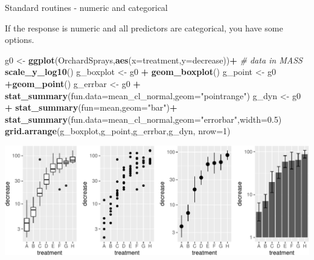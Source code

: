 \documentclass[
  ignorenonframetext,
]{beamer}
\newenvironment{Shaded}{\begin{snugshade}}{\end{snugshade}}
\newcommand{\CommentTok}[1]{\textcolor[rgb]{0.56,0.35,0.01}{\textit{#1}}}
\newcommand{\DataTypeTok}[1]{\textcolor[rgb]{0.13,0.29,0.53}{#1}}
\newcommand{\DecValTok}[1]{\textcolor[rgb]{0.00,0.00,0.81}{#1}}
\newcommand{\FloatTok}[1]{\textcolor[rgb]{0.00,0.00,0.81}{#1}}
\newcommand{\KeywordTok}[1]{\textcolor[rgb]{0.13,0.29,0.53}{\textbf{#1}}}
\newcommand{\NormalTok}[1]{#1}
\newcommand{\OperatorTok}[1]{\textcolor[rgb]{0.81,0.36,0.00}{\textbf{#1}}}
\newcommand{\StringTok}[1]{\textcolor[rgb]{0.31,0.60,0.02}{#1}}
\begin{document}
\begin{frame}[fragile]{Standard routines - numeric and categorical}
\protect\hypertarget{standard-routines---numeric-and-categorical}{}

If the response is numeric and all predictors are categorical, you have
some options.

\scriptsize

\begin{Shaded}
\begin{Highlighting}[]
\NormalTok{g0 <-}\StringTok{ }\KeywordTok{ggplot}\NormalTok{(OrchardSprays,}\KeywordTok{aes}\NormalTok{(}\DataTypeTok{x=}\NormalTok{treatment,}\DataTypeTok{y=}\NormalTok{decrease))}\OperatorTok{+}\StringTok{ }\CommentTok{# data in MASS}
\StringTok{  }\KeywordTok{scale_y_log10}\NormalTok{()}
\NormalTok{g_boxplot <-}\StringTok{ }\NormalTok{g0 }\OperatorTok{+}\StringTok{ }\KeywordTok{geom_boxplot}\NormalTok{()}
\NormalTok{g_point <-}\StringTok{ }\NormalTok{g0 }\OperatorTok{+}\KeywordTok{geom_point}\NormalTok{()}
\NormalTok{g_errbar <-}\StringTok{ }\NormalTok{g0 }\OperatorTok{+}\StringTok{ }\KeywordTok{stat_summary}\NormalTok{(}\DataTypeTok{fun.data=}\NormalTok{mean_cl_normal,}\DataTypeTok{geom=}\StringTok{"pointrange"}\NormalTok{)}
\NormalTok{g_dyn <-}\StringTok{ }\NormalTok{g0 }\OperatorTok{+}\StringTok{  }\KeywordTok{stat_summary}\NormalTok{(}\DataTypeTok{fun=}\NormalTok{mean,}\DataTypeTok{geom=}\StringTok{"bar"}\NormalTok{)}\OperatorTok{+}
\StringTok{  }\KeywordTok{stat_summary}\NormalTok{(}\DataTypeTok{fun.data=}\NormalTok{mean_cl_normal,}\DataTypeTok{geom=}\StringTok{"errorbar"}\NormalTok{,}\DataTypeTok{width=}\FloatTok{0.5}\NormalTok{)}
\KeywordTok{grid.arrange}\NormalTok{(g_boxplot,g_point,g_errbar,g_dyn, }\DataTypeTok{nrow=}\DecValTok{1}\NormalTok{)}
\end{Highlighting}
\end{Shaded}

\includegraphics{data_viz_files/figure-beamer/unnamed-chunk-10-1.pdf}

\end{frame}
\end{document}

